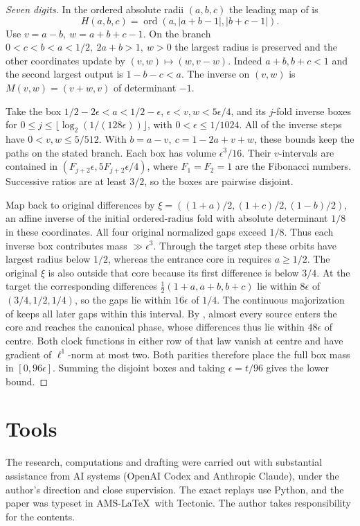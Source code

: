 \documentclass[11pt]{amsart}
\theoremstyle{definition}
\DeclareMathOperator{\ord}{ord}
\begin{document}
\begin{proof}[Seven digits]
In the ordered absolute radii \((a,b,c)\) the leading
map of \cite[Sections~1 and~3]{G5} is
\[
 H(a,b,c)=\ord(a,|a+b-1|,|b+c-1|).
\]
Use \(v=a-b,\ w=a+b+c-1\). On the branch
\(0<c<b<a<1/2,\ 2a+b>1,\ w>0\) the largest radius
is preserved and the other coordinates update by
\((v,w)\mapsto(w,v-w)\).
Indeed \(a+b,b+c<1\) and the second largest
output is \(1-b-c<a\).
The inverse on \((v,w)\) is \(M(v,w)=(v+w,v)\)
of determinant \(-1\).

Take the box \(1/2-2\epsilon<a<1/2-\epsilon\),
\(\epsilon<v,w<5\epsilon/4\), and its \(j\)-fold
inverse boxes for \(0\le j\le\lfloor\log_2(1/(128\epsilon))\rfloor\),
with \(0<\epsilon\le1/1024\). All of the inverse steps
have \(0<v,w\le5/512\). With
\(b=a-v,\ c=1-2a+v+w\), these bounds keep the paths
on the stated branch. Each box has volume
\(\epsilon^3/16\). Their \(v\)-intervals are contained in
\((F_{j+2}\epsilon,5F_{j+2}\epsilon/4)\), where
\(F_1=F_2=1\) are the Fibonacci numbers.
Successive ratios are at least \(3/2\), so the boxes
are pairwise disjoint.

Map back to original differences by
\(\xi=((1+a)/2,(1+c)/2,(1-b)/2)\),
an affine inverse of the initial ordered-radius fold
with absolute determinant \(1/8\) in these coordinates.
All four original normalized gaps exceed \(1/8\).
Thus each inverse box contributes mass \(\gg\epsilon^3\).
Through the target step these orbits have largest
radius below \(1/2\), whereas the entrance core in
\cite[Theorem~1]{G5} requires \(a\ge1/2\).
The original \(\xi\) is also outside that core because
its first difference is below \(3/4\).
At the target the corresponding differences
\(\tfrac12(1+a,a+b,b+c)\) lie within \(8\epsilon\)
of \((3/4,1/2,1/4)\), so the gaps lie within
\(16\epsilon\) of \(1/4\).
The continuous majorization of \cite[Theorem~1]{G4}
keeps all later gaps within this interval.
By \cite[Proposition~3 and Theorem~1]{G5}, almost every source enters
the core and reaches the canonical phase, whose differences thus
lie within \(48\epsilon\) of centre.
Both clock functions in either row of that law vanish
at centre and have gradient of \(\ell^1\)-norm at most
two. Both parities therefore place the full box mass
in \([0,96\epsilon]\).
Summing the disjoint boxes and taking \(\epsilon=t/96\)
gives the lower bound.
\end{proof}

\section*{Tools}
The research, computations and drafting were carried out with substantial assistance from AI systems (OpenAI Codex and Anthropic Claude), under the author's direction and close supervision.
The exact replays use Python, and the paper was typeset in AMS-\LaTeX\ with Tectonic.
The author takes responsibility for the contents.
\end{document}
